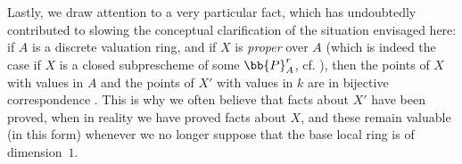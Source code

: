 \begin{env}[3.7.3]
\label{I.3.7.3}
Lastly, we draw attention to a very particular fact, which has undoubtedly contributed to slowing the conceptual clarification of the situation envisaged here: if $A$ is a discrete valuation ring, and if $X$ is \emph{proper} over $A$ (which is indeed the case if $X$ is a closed subprescheme of some $\bb{P}_A^r$, cf. ), then the points of $X$ with values in $A$ and the points of $X'$ with values in $k$ are in bijective correspondence .
This is why we often believe that facts about $X'$ have been proved, when in reality we have proved facts about $X$, and these remain valuable (in this form) whenever we no longer suppose that the base local ring is of dimension~$1$.
\end{env}
